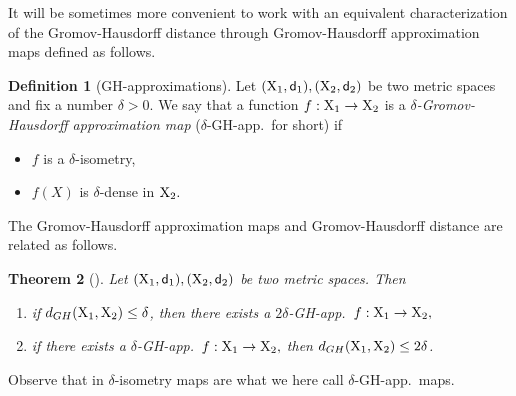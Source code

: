 \documentclass[11pt]{article}
\newcommand{\sfd}{{\sf d}}
\newcommand{\X}{{\rm X}}
\theoremstyle{plain}
\newtheorem{theorem}{Theorem}[section]
\theoremstyle{definition}
\newtheorem{definition}[theorem]{Definition}
\numberwithin{equation}{section}
\begin{document}
It will be sometimes more convenient to work with an equivalent characterization of the Gromov-Hausdorff distance through Gromov-Hausdorff approximation maps defined as follows.
\begin{definition}[GH-approximations]\label{ghappr}
	Let $(\X_1,\sfd_1),(\X_2,\sfd_2)$ be two metric spaces and fix a number $\delta>0$. We say that a function $f:\X_1 \to \X_2$ is a \emph{$\delta$-Gromov-Hausdorff approximation map} ($\delta$-GH-app.\ for short) if
	\begin{itemize}
		\item $f$ is a $\delta$-isometry,
		\item $f(X)$ is $\delta$-dense in $\X_2.$
	\end{itemize} 
\end{definition}
The Gromov-Hausdorff approximation maps and Gromov-Hausdorff distance are related as follows. 
\begin{theorem}[]\label{ghchar}
	Let $(\X_1,\sfd_1),(\X_2,\sfd_2)$ be two metric spaces. Then
	\begin{enumerate}
		\item if $d_{GH}(\X_1,\X_2)\le \delta$, then there exists a $2\delta$-GH-app.\ $f: \X_1 \to \X_2,$
		\item if there exists a $\delta$-GH-app.\ $f: \X_1 \to \X_2,$ then $d_{GH}(\X_1,\X_2)\le 2\delta$.
	\end{enumerate}
\end{theorem}
Observe that in \cite{burago} $\delta$-isometry maps are what we here call $\delta$-GH-app.\ maps.  
\end{document}

